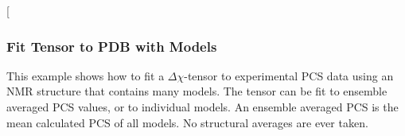 \documentclass[a4paper,10pt,english,openany,oneside]{sphinxmanual}
\begin{document}
%
\begin{sphinxVerbatim}[commandchars=\\\{\}]
           
           
              
               
               
                
                
                 
               
              
                  
               
                 
\end{sphinxVerbatim}


{[}\sphinxcode{\sphinxupquote{pcs\_fit\_multiple.png}}{]}

\noindent{}


\subsubsection{Fit Tensor to PDB with Models}
\label{\detokenize{examples/pcs_fit_models:fit-tensor-to-pdb-with-models}}\label{\detokenize{examples/pcs_fit_models:pcs-fit-models}}\label{\detokenize{examples/pcs_fit_models::doc}}
This example shows how to fit a \({\Delta\chi}\)-tensor to experimental PCS data using an NMR structure that contains many models. The tensor can be fit to ensemble averaged PCS values, or to individual models. An ensemble averaged PCS is the mean calculated PCS of all models. No structural averages are ever taken.
\end{document}
